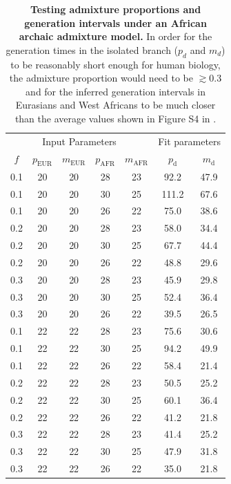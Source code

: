 \documentclass[]{article}
\begin{document}
\begin{table}[h]
    \centering
    \begin{tabular}[t]{ccccccc}
        \toprule
        \multicolumn{5}{c}{Input Parameters} & \multicolumn{2}{c}{Fit parameters} \\
        $f$ & $p_\text{EUR}$ & $m_\text{EUR}$ &
        $p_\text{AFR}$ & $m_\text{AFR}$ &
        $p_\text{d}$ & $m_\text{d}$ \\
        \midrule
        0.1 & 20 & 20 & 28 & 23 & 92.2 & 47.9 \\
        0.1 & 20 & 20 & 30 & 25 & 111.2 & 67.6 \\
        0.1 & 20 & 20 & 26 & 22 & 75.0 & 38.6 \\
        0.2 & 20 & 20 & 28 & 23 & 58.0 & 34.4 \\
        0.2 & 20 & 20 & 30 & 25 & 67.7 & 44.4 \\
        0.2 & 20 & 20 & 26 & 22 & 48.8 & 29.6 \\
        0.3 & 20 & 20 & 28 & 23 & 45.9 & 29.8 \\
        0.3 & 20 & 20 & 30 & 25 & 52.4 & 36.4 \\
        0.3 & 20 & 20 & 26 & 22 & 39.5 & 26.5 \\
        \midrule
        0.1 & 22 & 22 & 28 & 23 & 75.6 & 30.6 \\
        0.1 & 22 & 22 & 30 & 25 & 94.2 & 49.9 \\
        0.1 & 22 & 22 & 26 & 22 & 58.4 & 21.4 \\
        0.2 & 22 & 22 & 28 & 23 & 50.5 & 25.2 \\
        0.2 & 22 & 22 & 30 & 25 & 60.1 & 36.4 \\
        0.2 & 22 & 22 & 26 & 22 & 41.2 & 21.8 \\
        0.3 & 22 & 22 & 28 & 23 & 41.4 & 25.2 \\
        0.3 & 22 & 22 & 30 & 25 & 47.9 & 31.8 \\
        0.3 & 22 & 22 & 26 & 22 & 35.0 & 21.8 \\
        \bottomrule
    \end{tabular}
    \caption{
        \label{tab:structured-ages}
        \textbf{Testing admixture proportions and generation intervals under
        an African archaic admixture model.} In order for the generation
        times in the isolated branch ($p_d$ and $m_d$) to be reasonably
        short enough for human biology, the admixture proportion would need
        to be $\gtrsim0.3$ and for the inferred generation intervals
        in Eurasians and West Africans to be much closer than the average
        values shown in Figure S4 in \citet{wang2023human}.
    }
\end{table}
\end{document}
